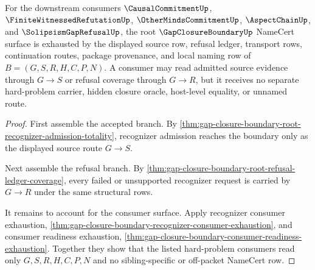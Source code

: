 \begin{theorem}
\label{thm:gap-closure-boundary-root-namecert-consumer-exhaustion}
For the downstream consumers $\CausalCommitmentUp$, $\FiniteWitnessedRefutationUp$, $\OtherMindsCommitmentUp$, $\AspectChainUp$, and $\SolipsismGapRefusalUp$, the root $\GapClosureBoundaryUp$ NameCert surface is exhausted by the displayed source row, refusal ledger, transport rows, continuation routes, package provenance, and local naming row of $B=(G,S,R,H,C,P,N)$. A consumer may read admitted source evidence through $G \longrightarrow S$ or refusal coverage through $G \longrightarrow R$, but it receives no separate hard-problem carrier, hidden closure oracle, host-level equality, or unnamed route.
\end{theorem}
\begin{proof}
First assemble the accepted branch. By \autoref{thm:gap-closure-boundary-root-recognizer-admission-totality}, recognizer admission reaches the boundary only as the displayed source route $G \longrightarrow S$.

Next assemble the refusal branch. By \autoref{thm:gap-closure-boundary-root-refusal-ledger-coverage}, every failed or unsupported recognizer request is carried by $G \longrightarrow R$ under the same structural rows.

It remains to account for the consumer surface. Apply recognizer consumer exhaustion, \autoref{thm:gap-closure-boundary-recognizer-consumer-exhaustion}, and consumer readiness exhaustion, \autoref{thm:gap-closure-boundary-consumer-readiness-exhaustion}. Together they show that the listed hard-problem consumers read only $G,S,R,H,C,P,N$ and no sibling-specific or off-packet NameCert row.
\end{proof}
